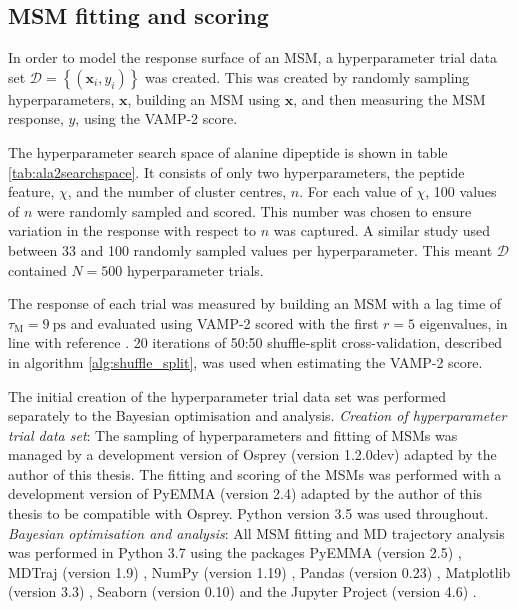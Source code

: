 \subsection{MSM fitting and scoring}\label{subsec:msm_fitting}
In order to  model the response surface of an MSM, a hyperparameter trial data set  $\mathcal{D} = \left\{ (\mathbf{x}_{i}, y_{i}) \right\}$ was created. This was created by  randomly sampling hyperparameters, $\mathbf{x}$, building an MSM using $\mathbf{x}$, and then measuring the MSM response, $y$, using the VAMP-2 score. 

The hyperparameter search space of alanine dipeptide is shown in table \ref{tab:ala2searchspace}. It consists of only two hyperparameters, the peptide feature, $\chi$, and the number of cluster centres, $n$.  For each value of $\chi$, \num{100} values of $n$ were randomly sampled and scored. This number was chosen to ensure variation in the response with respect to $n$ was captured. A similar study \cite{husicOptimizedParameterSelection2016} used between \num{33} and \num{100} randomly sampled values per hyperparameter. This meant $\mathcal{D}$ contained $N=500$ hyperparameter trials.  

The response of each trial was measured by building an MSM with a lag time of $\tau_{\mathrm{M}} = \SI{9}{\pico\second}$ and evaluated using VAMP-2 scored with the first $r=5$ eigenvalues, in line with reference \cite{bowmanQuantitativeComparisonAlternative2013}. \num{20} iterations of 50:50 shuffle-split cross-validation, described in algorithm \ref{alg:shuffle_split}, was used when estimating the VAMP-2 score. 

The initial creation of the hyperparameter trial data set was performed separately to the Bayesian optimisation and analysis. \emph{Creation of hyperparameter trial data set}: The sampling of hyperparameters and fitting of MSMs was managed by a development version of Osprey (version 1.2.0dev) \cite{mcgibbonOspreyHyperparameterOptimization2016} adapted by the author of this thesis. The fitting and scoring of the MSMs was performed with a development version of PyEMMA (version 2.4) \cite{schererPyEMMASoftwarePackage2015a} adapted by the author of this thesis to be compatible with Osprey. Python version 3.5 was used throughout. \emph{Bayesian optimisation and analysis}:
All MSM fitting and MD trajectory analysis was performed in Python 3.7 using the packages PyEMMA (version 2.5) \cite{schererPyEMMASoftwarePackage2015a}, MDTraj (version 1.9) \cite{mcgibbonMDTrajModernOpen2015}, NumPy (version 1.19) \cite{waltNumPyArrayStructure2011}, Pandas (version 0.23) \cite{mckinneyPandasFoundationalPython2011}, Matplotlib (version 3.3) \cite{hunterMatplotlib2DGraphics2007},  Seaborn (version 0.10) \cite{michaelwaskomMwaskomSeabornV02020} and the Jupyter Project (version 4.6) \cite{kluyverJupyterNotebooksPublishing2016}.

